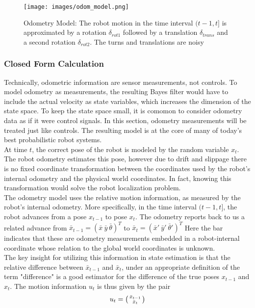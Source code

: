 \begin{figure}[H]
  \begin{center}
    \texttt{[image: images/odom\_model.png]}
  \end{center}
  \caption{Odometry Model: The robot motion in the time interval $(t-1, t]$ is approximated by a rotation $\delta_{rot1}$ followed by a translation $\delta_{trans}$ and a second rotation $\delta_{rot2}$. The turns and translations are noisy}\label{fig:Odomtery Model}
\end{figure}

\subsubsection{Closed Form Calculation}

Technically, odometric information are sensor measurements, not controls. To model odometry as measurements, the resulting Bayes filter would have to include the actual velocity as state variables, which increases the dimension of the state space.
To keep the state space small, it is comomon to consider odometry data as if it were control signals. In this section, odometry measurements will be treated just like controls.
The resulting model is at the core of many of today's best probabilistic robot systems.\\

At time $t$, the correct pose of the robot is modeled by the random variable $x_t$. The robot odometry estimates this pose, however due to drift and slippage there is no fixed
coordinate transformation between the coordinates used by the robot's internal odometry and the physical world coordinates. In fact, knowing this transformation would solve the robot localization problem.\\

The odometry model uses the relative motion information, as measured by the robot's internal odometry. More specifically, in the time interval $(t-1,t]$, the robot advances from a pose $x_{t-1}$ to pose $x_t$.
The odometry reports back to us a related advance from $\bar{x}_{t-1}= (\bar{x} \ \bar{y} \ \bar{\theta})^T$ to $\bar{x}_{t} = (\bar{x}' \ \bar{y}' \ \bar{\theta}')^T$
Here the bar indicates that these are odometry measurements embedded in a robot-internal coordinate whose relation to the global world coordinates is unknown. \\

The key insight for utilizing this information in state estimation is that the relative difference between $\bar{x}_{t-1}$ and $\bar{x}_t$, under an appropriate definition of the term "difference" is a good estimator for the difference of the true poses $x_{t-1}$ and $x_t$.
The motion information $u_t$ is thus given by the pair
\begin{equation}
  u_t = \begin{psmallmatrix} \bar{x}_{t-1} \\ \bar{x}_{t}\end{psmallmatrix}
  \label{eq:odom motion information}
\end{equation}

